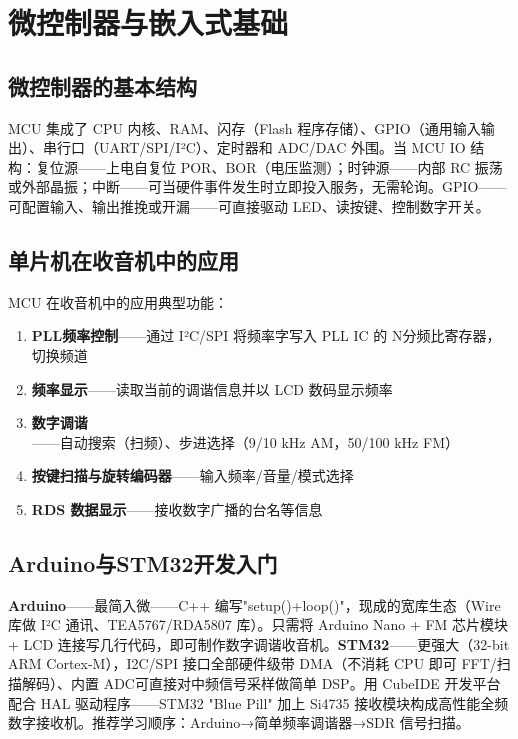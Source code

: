 \documentclass[12pt,UTF8]{ctexbook}
\begin{document}
\section{微控制器与嵌入式基础}
\label{sec:mcu_basics}

\subsection{微控制器的基本结构}

MCU 集成了 CPU 内核、RAM、闪存（Flash 程序存储）、GPIO（通用输入输出）、串行口（UART/SPI/I²C）、定时器和 ADC/DAC 外围。当 MCU IO 结构：复位源——上电自复位 POR、BOR（电压监测）；时钟源——内部 RC 振荡或外部晶振；中断——可当硬件事件发生时立即投入服务，无需轮询。GPIO——可配置输入、输出推挽或开漏——可直接驱动 LED、读按键、控制数字开关。

\subsection{单片机在收音机中的应用}

MCU 在收音机中的应用典型功能：
\begin{enumerate}
\item \textbf{PLL频率控制}——通过 I²C/SPI 将频率字写入 PLL IC 的 N分频比寄存器，切换频道
\item \textbf{频率显示}——读取当前的调谐信息并以 LCD 数码显示频率
\item \textbf{数字调谐}——自动搜索（扫频）、步进选择（9/10 kHz AM，50/100 kHz FM）
\item \textbf{按键扫描与旋转编码器}——输入频率/音量/模式选择
\item \textbf{RDS 数据显示}——接收数字广播的台名等信息
\end{enumerate}

\subsection{Arduino与STM32开发入门}

\textbf{Arduino}——最简入微——C++ 编写"setup()+loop()"，现成的宽库生态（Wire 库做 I²C 通讯、TEA5767/RDA5807 库）。只需将 Arduino Nano + FM 芯片模块+ LCD 连接写几行代码，即可制作数字调谐收音机。\textbf{STM32}——更强大（32-bit ARM Cortex-M），I2C/SPI 接口全部硬件级带 DMA（不消耗 CPU 即可 FFT/扫描解码）、内置 ADC可直接对中频信号采样做简单 DSP。用 CubeIDE 开发平台配合 HAL 驱动程序——STM32 "Blue Pill" 加上 Si4735 接收模块构成高性能全频数字接收机。推荐学习顺序：Arduino→简单频率调谐器→SDR 信号扫描。
\end{document}
